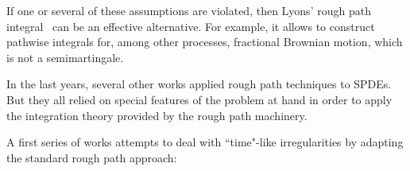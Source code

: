 \documentclass[a4paper,11pt]{article}
\newcommand{\mathd}{\mathrm{d}}
\theoremstyle{remark}
\begin{document}
If one or several of these assumptions are violated, then Lyons' rough path integral~\cite{Lyons1998, Lyons2002, Lyons2007, Friz2010} can be an effective alternative. For example, it allows to construct pathwise  integrals for, among other processes, fractional Brownian motion, which is not a semimartingale. 




In the last years, several other works applied rough path techniques to SPDEs. 
But they all relied on special features of the problem at hand in order to apply the integration theory provided by the rough path machinery. 

A first series of works attempts to deal with ``time"-like irregularities by adapting the standard rough path approach:
\end{document}
